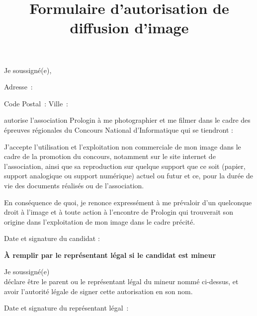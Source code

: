 \documentclass[a4paper,11pt]{prologin}
\title{Formulaire d'autorisation de diffusion d'image}
\begin{document}
Je soussigné(e), \dotfill

Adresse~:\dotfill

Code Postal~: \dotfill  Ville~: \dotfill

autorise l'association Prologin à me photographier et me filmer dans
le cadre des épreuves régionales du Concours National d'Informatique qui se
tiendront :

\small
{}
\normalsize

J'accepte l'utilisation et l'exploitation non commerciale de mon
image dans le cadre de la promotion du concours, notamment sur le site internet
de l'association, ainsi que sa reproduction sur quelque support que ce soit
(papier, support analogique ou support numérique) actuel ou futur et ce, pour la
durée de vie des documents réalisés ou de l'association.

En conséquence de quoi, je renonce expressément à me prévaloir d'un
quelconque droit à l'image et à toute action à l'encontre de Prologin qui
trouverait son origine dans l'exploitation de mon image dans le cadre précité.

Date et signature du candidat :\vspace\baselineskip

\textbf{À remplir par le représentant légal si le candidat est mineur}

Je soussigné(e) \dotfill\\
déclare être le parent ou le représentant légal du mineur nommé
ci-dessus, et avoir l'autorité légale de signer cette autorisation en son nom.

Date et signature du représentant légal~:
\end{document}
